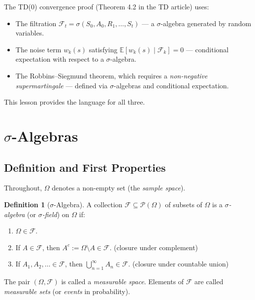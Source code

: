 \documentclass[11pt,a4paper]{article}
\theoremstyle{definition}
\newtheorem{definition}{Definition}[section]
\theoremstyle{plain}
\theoremstyle{remark}
\newcommand{\E}{\mathbb{E}}
\newcommand{\powerset}{\mathcal{P}}
\begin{document}
\begin{rlconnection}
The TD(0) convergence proof (Theorem 4.2 in the TD article) uses:
\begin{itemize}[nosep]
    \item The filtration $\mathcal{F}_t = \sigma(S_0, A_0, R_1, \ldots, S_t)$ --- a $\sigma$-algebra generated by random variables.
    \item The noise term $w_k(s)$ satisfying $\E[w_k(s) \mid \mathcal{F}_k] = 0$ --- conditional expectation with respect to a $\sigma$-algebra.
    \item The Robbins--Siegmund theorem, which requires a \emph{non-negative supermartingale} --- defined via $\sigma$-algebras and conditional expectation.
\end{itemize}
This lesson provides the language for all three.
\end{rlconnection}

\section{$\sigma$-Algebras}
\label{sec:sigma_algebras}

\subsection{Definition and First Properties}
\label{subsec:sigma_def}

Throughout, $\Omega$ denotes a non-empty set (the \emph{sample space}).

\begin{definition}[$\sigma$-Algebra]
\label{def:sigma_algebra}
A collection $\mathcal{F} \subseteq \powerset(\Omega)$ of subsets of $\Omega$ is a
\emph{$\sigma$-algebra} (or \emph{$\sigma$-field}) on $\Omega$ if:
\begin{enumerate}[nosep,label=(\roman*)]
    \item $\Omega \in \mathcal{F}$.
    \item If $A \in \mathcal{F}$, then $A^c := \Omega \setminus A \in \mathcal{F}$.
    \hfill(closure under complement)
    \item If $A_1, A_2, \ldots \in \mathcal{F}$, then $\bigcup_{n=1}^\infty A_n \in \mathcal{F}$.
    \hfill(closure under countable union)
\end{enumerate}
The pair $(\Omega, \mathcal{F})$ is called a \emph{measurable space}. Elements of
$\mathcal{F}$ are called \emph{measurable sets} (or \emph{events} in probability).
\end{definition}
\end{document}
